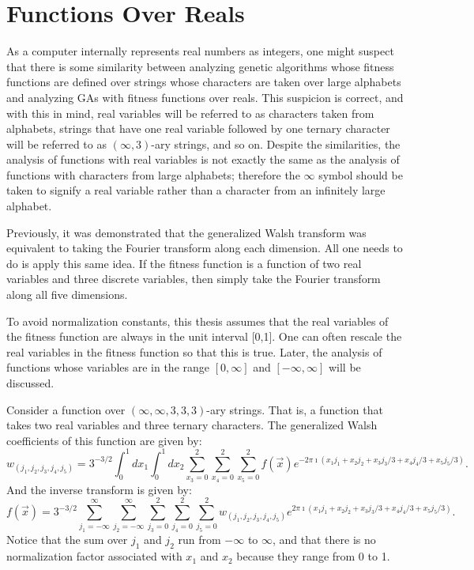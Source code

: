 \section{Functions Over Reals}
As a computer internally represents real numbers as integers, one might suspect
that there is some similarity between analyzing genetic
algorithms whose fitness functions are defined over
strings whose characters are taken over large alphabets and analyzing
GAs with fitness functions over reals.
This suspicion is correct, and with this in mind, real variables will
be referred to as characters taken from \inftyary alphabets,
strings that have one real variable followed by one ternary character will
be referred to as $(\infty,3)$-ary strings, and so on.  
Despite the similarities, the analysis of functions with real variables
is not exactly the same as the analysis of functions with characters from
large alphabets; therefore the $\infty$ symbol should be taken to signify
a real variable rather than a character from an infinitely large alphabet.

Previously, it was demonstrated that the generalized Walsh transform
was equivalent to taking the Fourier transform along each dimension.
All one needs to do is apply this same idea.  If the fitness function
is a function of two real variables and three discrete variables,
 then
simply take the Fourier transform along all five dimensions. 

To avoid normalization constants, this thesis assumes that the real variables
of the fitness function are always in the unit interval [0,1].
One can often rescale the real variables in the fitness function so that
this is true.
Later, the analysis of functions whose variables are in the range
$[0,\infty]$ and $[-\infty,\infty]$ will be discussed.

Consider a function over $(\infty,\infty,3,3,3)$-ary strings.
That is, a function that takes two real variables and three ternary
characters.
The generalized Walsh coefficients of this function are given by:
\begin{equation}
w_{(j_1,j_2,j_3,j_4,j_5)} = 3^{-3/2}
\int_0^1{dx_1 \int_0^1{dx_2 \sum_{x_3=0}^2{\sum_{x_4=0}^2{\sum_{x_5=0}^2{f(\vec{x})
	e^{-2 \pi \imath (x_1 j_1 + x_2 j_2 + x_3 j_3/3 + x_4 j_4/3 + x_5 j_5/3)}}}}}} .
\end{equation}
And the inverse transform is given by:
\begin{equation}
f(\vec{x})= 3^{-3/2}
\sum_{j_1=-\infty}^{\infty}{ \sum_{j_2=-\infty}^{\infty}{
	\sum_{j_3=0}^2{ \sum_{j_4=0}^2{ \sum_{j_5=0}^2 {
	w_{(j_1,j_2,j_3,j_4,j_5)}
	e^{2 \pi \imath (x_1 j_1 + x_2 j_2 + x_3 j_3/3 + x_4 j_4/3 + x_5 j_5/3)}}}}}} .
\end{equation}
Notice that the sum over $j_1$ and $j_2$ run from $-\infty$ to $\infty$,
and that there is no normalization factor associated with $x_1$ and $x_2$
because they range from 0 to 1.

